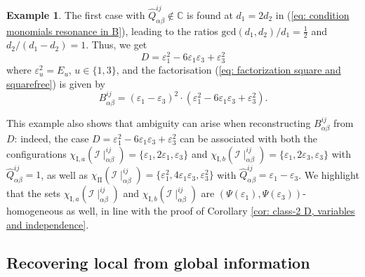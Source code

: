 \documentclass[10pt]{article}
\theoremstyle{remark}%
\theoremstyle{definition}%
\newtheorem{example}{Example}%
\begin{document}
\begin{example}
\label{exa: class-2 D first occurrence} 
The first case with $\hat{Q}_{\alpha\beta}^{ij}\notin\mathbb{C}$ is found at $d_{1}=2d_{2}$ in (\ref{eq: condition monomials resonance in B}), leading to the ratios $\mathrm{gcd}(d_{1},d_{2})/d_{1}=\frac{1}{2}$ and $d_{2}/(d_{1}-d_{2})=1$. Thus, we get 
 \begin{equation}
D=\varepsilon_{1}^{2}-6\varepsilon_{1}\varepsilon_{3}+\varepsilon_{3}^{2}
\label{eq: class-2 D first occurrence}
 \end{equation}
where $\varepsilon_{u}^{2}=E_{u}$, $u\in\{1,3\}$, and the factorisation
(\ref{eq: factorization square and squarefree}) is given by 
\begin{equation} 
B_{\alpha\beta}^{ij}=(\varepsilon_{1}-\varepsilon_{3})^{2}\cdot(\varepsilon_{1}^{2}-6\varepsilon_{1}\varepsilon_{3}+\varepsilon_{3}^{2}).
\label{eq: class-2 B first occurrence}
\end{equation}

This example also shows that ambiguity can arise when reconstructing
$B_{\alpha\beta}^{ij}$ from $D$: indeed, the case $D=\varepsilon_{1}^{2}-6\varepsilon_{1}\varepsilon_{3}+\varepsilon_{3}^{2}$ can be associated with both the configurations $\chi_{\mathrm{I},a}(\mathcal{I}\mid_{\alpha\beta}^{ij})=\{\varepsilon_{1},2\varepsilon_{1},\varepsilon_{3}\}$
and $\chi_{\mathrm{I},b}(\mathcal{I}\mid_{\alpha\beta}^{ij})=\{\varepsilon_{1},2\varepsilon_{3},\varepsilon_{3}\}$
with $\hat{Q}_{\alpha\beta}^{ij}=1$, as well as $\chi_{\mathrm{II}}(\mathcal{I}\mid_{\alpha\beta}^{ij})=\{\varepsilon_{1}^{2},4\varepsilon_{1}\varepsilon_{3},\varepsilon_{3}^{2}\}$ with $\hat{Q}_{\alpha\beta}^{ij}=\varepsilon_{1}-\varepsilon_{3}$. We highlight that the sets $\chi_{\mathrm{I},a}(\mathcal{I}\mid_{\alpha\beta}^{ij})$ and $\chi_{\mathrm{I},b}(\mathcal{I}\mid_{\alpha\beta}^{ij})$ are $(\Psi(\varepsilon_{1}),\Psi(\varepsilon_{3}))$-homogeneous
as well, in line with the proof of Corollary \ref{cor: class-2 D, variables and independence}. 
\end{example}

\subsection{\label{subsec: Recovering local from global data} Recovering local from global information}
\end{document}
